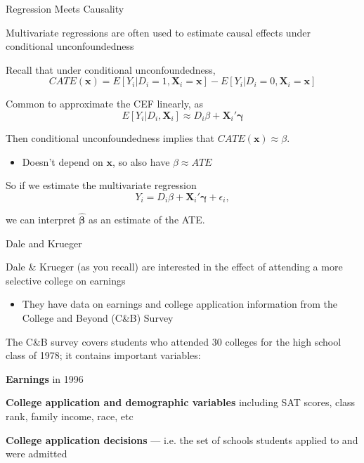 \documentclass[11pt,english,handout]{beamer}
\newenvironment{wideitemize}{\itemize\addtolength{\itemsep}{10pt}}{\enditemize}
\begin{document}
	\begin{frame}{Regression Meets Causality} 
	
\vspace{0.2cm}
	\begin{wideitemize}
		\item
		Multivariate regressions are often used to estimate causal effects under conditional unconfoundedness
		
		\pause
		\item
		Recall that under conditional unconfoundedness,
		$$CATE(\bm{x}) = E[ Y_{i}  | D_i =1, \bm{X}_i = \bm{x} ] - E[Y_{i} | D_i =0 , \bm{X}_i =\bm{x}]  $$
		
		\pause
		\item
		Common to approximate the CEF linearly, as 
		$$E[ Y_i | D_i, \bm{X}_i  ] \approx D_i  \beta +  \bm{X}_i' \bm{\gamma} $$ 
		
		\pause
		\item
		Then conditional unconfoundedness implies that $CATE(\bm{x}) \approx \beta$. \smallskip
		\begin{itemize}
		\item Doesn't depend on $\mathbf{x}$, so also have $\beta\approx ATE$
		\end{itemize}
		
		\pause
		\item
		So if we estimate the multivariate regression 
		$$Y_i = D_i \beta + \bm{X}_i' \bm{\gamma} + \epsilon_i,$$
		
		\noindent we can interpret $\bm{\hat\beta}$ as an estimate of the ATE.
	\end{wideitemize}
	
\end{frame}




\begin{frame}{Dale and Krueger} 
		\begin{wideitemize}
			\item
			Dale \& Krueger (as you recall) are interested in the effect of attending a more selective college on earnings\smallskip
			\begin{itemize}
			\item
			They have data on earnings and college application information from the College and Beyond (C\&B) Survey 
			\end{itemize}
			\pause
			\item
			The C\&B survey covers students who attended 30 colleges for the high school class of 1978; it contains important variables:
			
			\pause
			\item
			\textbf{Earnings} in 1996
			
			\item
			\textbf{College application and demographic variables} including SAT scores, class rank, family income, race, etc
			
			\item
			\textbf{College application decisions} --- i.e. the set of schools students applied to and were admitted
				
		\end{wideitemize}	
\end{frame}
\end{document}
